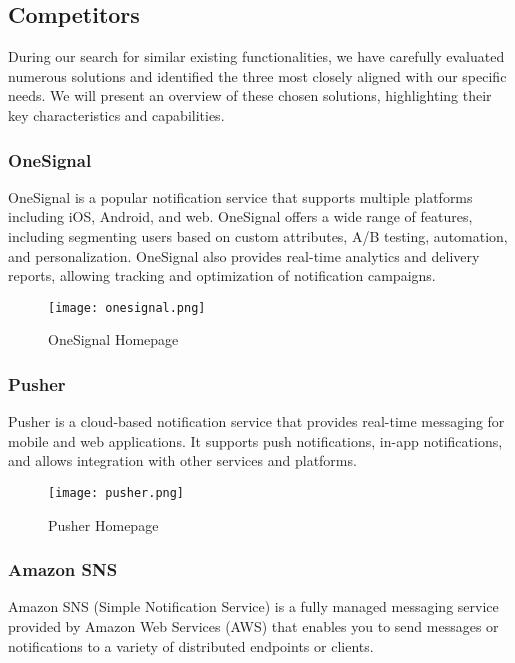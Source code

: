 \subsection{Competitors}
During our search for similar existing functionalities, we have carefully evaluated numerous solutions 
and identified the three most closely aligned with our specific needs.
We will present an overview of these chosen solutions, highlighting their key characteristics and capabilities.

\subsubsection{OneSignal} 
OneSignal is a popular notification service that supports multiple platforms including iOS, Android, and web. 
OneSignal offers a wide range of features, including segmenting users based on custom attributes, A/B testing, 
automation, and personalization. OneSignal also provides real-time analytics and delivery reports, allowing 
tracking and optimization of notification campaigns.

\begin{figure}[hbt!]
    \centering
    \texttt{[image: onesignal.png]}
    \caption{OneSignal Homepage}
\end{figure}

\subsubsection{Pusher}
Pusher is a cloud-based notification service that provides real-time messaging for mobile and web applications.
It supports push notifications, in-app notifications, and allows integration with other services and platforms. \\

\begin{figure}[hbt!]
    \centering
    \texttt{[image: pusher.png]}
    \caption{Pusher Homepage}
\end{figure}

\subsubsection{Amazon SNS}
Amazon SNS (Simple Notification Service) is a fully managed messaging service provided by Amazon Web 
Services (AWS) that enables you to send messages or notifications to a variety of distributed endpoints 
or clients. \\

